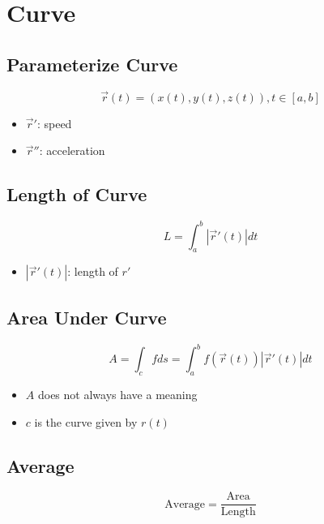 \section{Curve}

  \subsection{Parameterize Curve}

    \begin{equation}
      \vec{r}\left( t \right) = \left( x(t), y(t), z(t) \right), t \in \left[ a, b \right]
    \end{equation}

    \begin{itemize}
      \item $ \vec{r}' $: speed
      \item $ \vec{r}'' $: acceleration
    \end{itemize}

  \subsection{Length of Curve}

    \begin{equation}
      L = \int_{a}^{b} \left| \vec{r}'\left( t \right) \right| dt
    \end{equation}

    \begin{itemize}
      \item $ \left| \vec{r}'\left( t \right) \right| $: length of $ r' $
    \end{itemize}

  \subsection{Area Under Curve}

    \begin{equation}
      A = \int_{c} fds = \int_{a}^{b} f\left( \vec{r}(t) \right) \left| \vec{r}'(t) \right| dt
    \end{equation}

    \begin{itemize}
      \item $ A $ does not always have a meaning
      \item $ c $ is the curve given by $ r\left( t \right) $
    \end{itemize}

  \subsection{Average}

    \begin{equation}
      \text{Average} = \frac{\text{Area}}{\text{Length}}
    \end{equation}